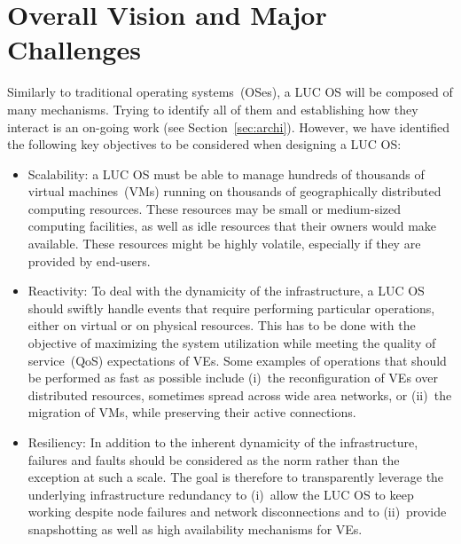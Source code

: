 \section{Overall Vision and Major Challenges\label{sec:challenges}}

Similarly to traditional operating systems~(OSes), a LUC OS will be composed of
many mechanisms. Trying to identify all of them and establishing how they
interact is an on-going work (see Section~\ref{sec:archi}). However,
we have identified the following
key objectives to be considered when designing a LUC OS:

\begin{itemize} 
\item Scalability: a LUC OS must be able to manage hundreds of
  thousands of virtual machines~(VMs) running on thousands of 
  geographically distributed computing resources.  These resources may be small or
  medium-sized computing facilities, as well as idle resources that their owners would make available. These resources might be
  highly volatile, especially if they are provided by
  end-users.
\item Reactivity: To deal with the dynamicity of the infrastructure, a LUC OS
  should swiftly handle events that require performing particular
  operations, either on virtual or on physical resources. This has to be done with the
  objective of maximizing the system utilization while meeting the quality of service~(QoS) expectations of VEs. 
  Some examples of operations that should be performed as fast as possible include (i)~the reconfiguration
  of VEs over distributed resources, sometimes spread across wide area networks, or (ii)~the migration of VMs, 
  while preserving their active connections.
\item Resiliency: In addition to the inherent dynamicity of the
  infrastructure, failures and faults should be considered as the norm rather than the
exception at such a scale. The goal is therefore to transparently leverage the
underlying infrastructure redundancy to (i)~allow the LUC OS to keep
working despite node failures and network disconnections and to (ii)~provide
snapshotting as well as high availability mechanisms for VEs.



\end{itemize}

